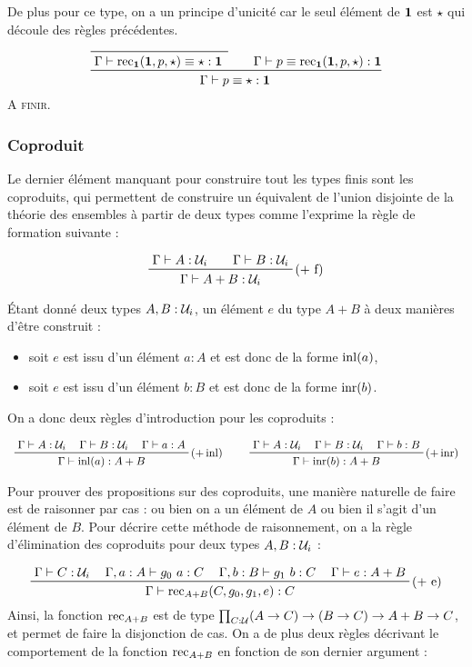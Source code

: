 \documentclass[../../rapport.tex]{subfiles}
\begin{document}
  De plus pour ce type, on a un principe d'unicité car le seul élément de $\operatorname{\textbf{1}}$ est $\star$ qui découle des règles précédentes.

  $$
  \prfinterspace=2em
  \prftree{
      \prftree{}
      {\Gamma \vdash \rec_{\1}(\1, p, \star) \equiv \star : \1}
    }
    {
      \Gamma \vdash p \equiv \rec_{\1}(\1, p, \star) : \1
    }
    {\Gamma \vdash p \equiv \star : \1}
  $$
  \textsc{A finir.}

  \subsubsection{Coproduit}

  Le dernier élément manquant pour construire tout les types finis sont les coproduits,
  qui permettent de construire un équivalent de l'union disjointe de la théorie des ensembles à partir de deux types
  comme l'exprime la règle de formation suivante :

  $$
  \prfinterspace=2em
  \prftree[r]{($+$ f)}{\Gamma \vdash A : \U_i}{\Gamma \vdash B : \U_i}
    {\Gamma \vdash A + B : \U_i}
  $$

  Étant donné deux types $A, B : \mathcal U_i$, un élément $e$ du type $A + B$ à deux manières d'être construit :
  \begin{itemize}
    \item soit $e$ est issu d'un élément $a : A$ et est donc de la forme $\operatorname{inl}(a)$,
    \item soit $e$ est issu d'un élément $b : B$ et est donc de la forme $\operatorname{inr}(b)$.
  \end{itemize}
  On a donc deux règles d'introduction pour les coproduits :

  $$
  \prfinterspace=1.2em
  \begin{array}{cc}
    \prftree[r]{($+ \inl)$}{\Gamma \vdash A : \U_i}{\Gamma \vdash B : \U_i}{\Gamma \vdash a : A}{\Gamma \vdash \inl(a) : A + B} \hspace{0.5cm}
    & \prftree[r]{($+ \inr)$}{\Gamma \vdash A : \U_i}{\Gamma \vdash B : \U_i}{\Gamma \vdash b : B}{\Gamma \vdash \inr(b) : A + B}
  \end{array}
  $$

  Pour prouver des propositions sur des coproduits, une manière naturelle de faire est de raisonner par cas :
  ou bien on a un élément de $A$ ou bien il s'agit d'un élément de $B$.
  Pour décrire cette méthode de raisonnement, on a la règle d'élimination des coproduits pour deux types $A, B : \mathcal U_i$ :

  $$
  \prfinterspace=1.2em
  \prftree[r]{($+$ e)}{\Gamma \vdash C : \U_i}{\Gamma, a : A \vdash g_0\ a : C}{\Gamma, b : B \vdash g_1\ b : C}{\Gamma \vdash e : A + B}
    {\Gamma \vdash \rec_{A+B}(C, g_0, g_1, e) : C}
  $$
  Ainsi, la fonction $\operatorname{rec}_{A+B}$ est de type $\prod_{C : \mathcal U}(A \rightarrow C) \rightarrow (B \rightarrow C) \rightarrow A + B \rightarrow C$,
  et permet de faire la disjonction de cas.
  On a de plus deux règles décrivant le comportement de la fonction $\operatorname{rec}_{A+B}$ en fonction de son dernier argument :
\end{document}
